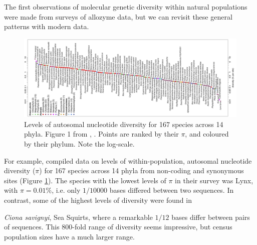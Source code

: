 {The first observations of molecular genetic diversity within natural populations were made from surveys of allozyme data, but we can revisit these general patterns with modern data. \\
\begin{figure}
\begin{center}
\includegraphics[width= \textwidth]{Journal_figs/alleles_genotypes/Leffer_riddle/Leffer_riddle_diversity.png}
\end{center}
\caption{Levels of autosomal nucleotide diversity for 167
species across 14 phyla. Figure 1 from \citet{leffler:12}, \PLOSccBY. Points are
ranked by their $\pi$, and coloured by their phylum. Note the log-scale.} \label{fig:Leffer}
\end{figure}
For
example, \citet{leffler:12} compiled data on levels of within-population,
autosomal nucleotide diversity ($\pi$) for 167 species across 14 phyla from
non-coding and synonymous sites (Figure \ref{fig:Leffer}). The species with the lowest levels of
$\pi$ in their survey was Lynx, with $\pi = 0.01\%$, i.e. only
$1/10000$ bases differed between two sequences. In contrast, some of the highest levels of
diversity were found in {\textit{Ciona savignyi}, Sea Squirts, where a remarkable
$1/12$ bases differ between pairs of sequences. This $800$-fold range of
diversity seems impressive, but census population sizes have a much
larger range.

}}
